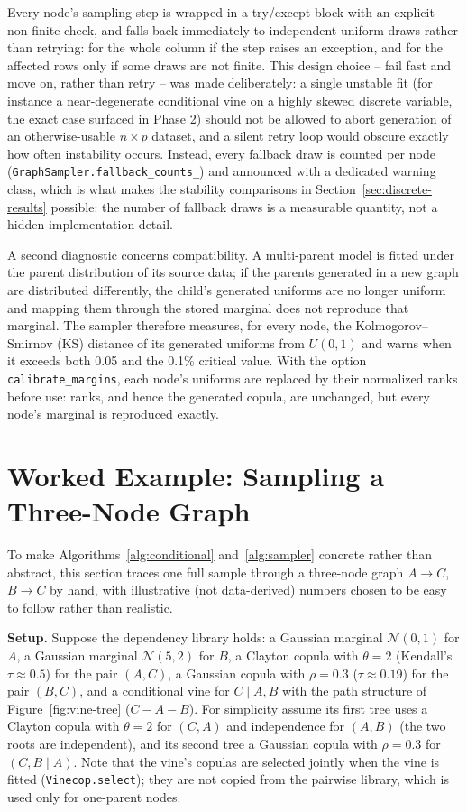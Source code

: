 \documentclass[
  english,
  class=report,
  accentcolor=2c,
  marginpar=false,
  parskip=half-,
  fontsize=11pt,
  ruledheaders=false,
  pdfa=false,
  IMRAD=false,
  thesis={type=master}
]{tudapub}
\begin{document}
Every node's sampling step is wrapped in a try/except block with an explicit
non-finite check, and falls back immediately to independent uniform draws
rather than retrying: for the whole column if the step raises an exception,
and for the affected rows only if some draws are not finite. This design choice -- fail fast and move
on, rather than retry -- was made deliberately: a single unstable fit (for
instance a near-degenerate conditional vine on a highly skewed discrete
variable, the exact case surfaced in Phase 2) should not be allowed to abort
generation of an otherwise-usable $n \times p$ dataset, and a silent retry
loop would obscure exactly how often instability occurs. Instead, every
fallback draw is counted per node (\texttt{GraphSampler.fallback\_counts\_})
and announced with a dedicated warning class, which is what makes the
stability comparisons in Section~\ref{sec:discrete-results} possible: the
number of fallback draws is a measurable quantity, not a hidden
implementation detail.

A second diagnostic concerns compatibility. A multi-parent model is fitted
under the parent distribution of its source data; if the parents generated
in a new graph are distributed differently, the child's generated uniforms
are no longer uniform and mapping them through the stored marginal does not
reproduce that marginal. The sampler therefore measures, for every node,
the Kolmogorov--Smirnov (KS) distance of its generated uniforms from $U(0,1)$
and warns when it exceeds both 0.05 and the 0.1\% critical value. With the
option \texttt{calibrate\_margins}, each node's uniforms are replaced by
their normalized ranks before use: ranks, and hence the generated copula,
are unchanged, but every node's marginal is reproduced exactly.

\section{Worked Example: Sampling a Three-Node Graph}
\label{sec:worked-example}
To make Algorithms~\ref{alg:conditional} and~\ref{alg:sampler} concrete
rather than abstract, this section traces one full sample through a
three-node graph $A \to C$, $B \to C$ by hand, with illustrative (not
data-derived) numbers chosen to be easy to follow rather than realistic.

\textbf{Setup.} Suppose the dependency library holds: a Gaussian marginal
$\mathcal{N}(0,1)$ for $A$, a Gaussian marginal $\mathcal{N}(5,2)$ for $B$,
a Clayton copula with $\theta=2$ (Kendall's $\tau \approx 0.5$) for the pair
$(A,C)$, a Gaussian copula with $\rho=0.3$ ($\tau \approx 0.19$) for the
pair $(B,C)$, and a conditional vine for $C \mid A, B$ with the path
structure of Figure~\ref{fig:vine-tree} ($C - A - B$). For simplicity
assume its first tree uses a Clayton copula with $\theta=2$ for $(C,A)$ and
independence for $(A,B)$ (the two roots are independent), and its second
tree a Gaussian copula with $\rho=0.3$ for $(C,B \mid A)$. Note that the
vine's copulas are selected jointly when the vine is fitted
(\texttt{Vinecop.select}); they are not copied from the pairwise library,
which is used only for one-parent nodes.
\end{document}
